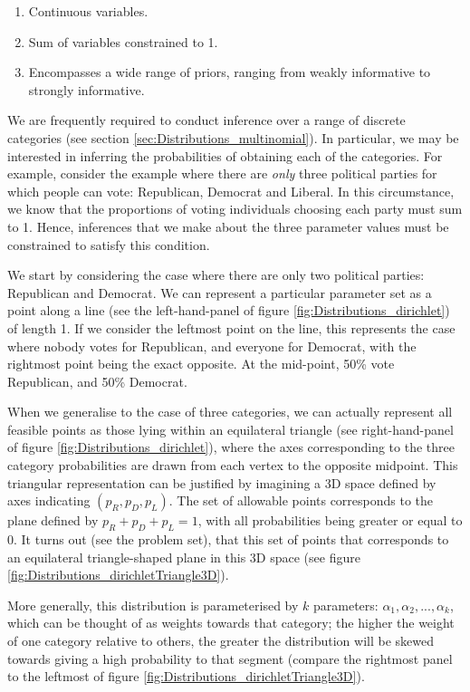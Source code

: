 \documentclass[11pt,fullpage]{book}
\begin{document}
\begin{enumerate} 
\item Continuous variables.
\item Sum of variables constrained to 1.
\item Encompasses a wide range of priors, ranging from weakly informative to strongly informative.
\end{enumerate}

We are frequently required to conduct inference over a range of discrete categories (see section \ref{sec:Distributions_multinomial}). In particular, we may be interested in inferring the probabilities of obtaining each of the categories. For example, consider the example where there are \textit{only} three political parties for which people can vote: Republican, Democrat and Liberal. In this circumstance, we know that the proportions of voting individuals choosing each party must sum to 1. Hence, inferences that we make about the three parameter values must be constrained to satisfy this condition. 

We start by considering the case where there are only two political parties: Republican and Democrat. We can represent a particular parameter set as a point along a line (see the left-hand-panel of figure \ref{fig:Distributions_dirichlet}) of length 1. If we consider the leftmost point on the line, this represents the case where nobody votes for Republican, and everyone for Democrat, with the rightmost point being the exact opposite. At the mid-point, 50\% vote Republican, and 50\% Democrat. 

When we generalise to the case of three categories, we can actually represent all feasible points as those lying within an equilateral triangle (see right-hand-panel of figure \ref{fig:Distributions_dirichlet}), where the axes corresponding to the three category probabilities are drawn from each vertex to the opposite midpoint. This triangular representation can be justified by imagining a 3D space defined by axes indicating $(p_R,p_D,p_L)$. The set of allowable points corresponds to the plane defined by $p_R+p_D+p_L=1$, with all probabilities being greater or equal to 0. It turns out (see the problem set), that this set of points that corresponds to an equilateral triangle-shaped plane in this 3D space (see figure \ref{fig:Distributions_dirichletTriangle3D}).

More generally, this distribution is parameterised by $k$ parameters: $\alpha_1,\alpha_2,...,\alpha_k$, which can be thought of as weights towards that category; the higher the weight of one category relative to others, the greater the distribution will be skewed towards giving a high probability to that segment (compare the rightmost panel to the leftmost of figure \ref{fig:Distributions_dirichletTriangle3D}).
\end{document}
